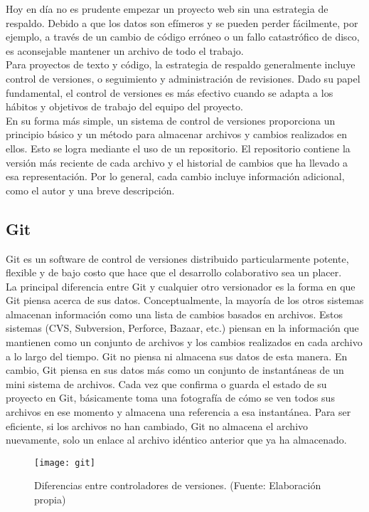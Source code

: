 Hoy en día no es prudente empezar un proyecto web sin una estrategia de respaldo. Debido a que los datos son efímeros y se pueden perder fácilmente, por ejemplo, a través de un cambio de código erróneo o un fallo catastrófico de disco, es aconsejable mantener un archivo de todo el trabajo.\\[0.8cm]
Para proyectos de texto y código, la estrategia de respaldo generalmente incluye control de versiones, o seguimiento y administración de revisiones.  Dado su papel fundamental, el control de versiones es más efectivo cuando se adapta a los hábitos y objetivos de trabajo del equipo del proyecto.\\[0.8cm]
En su forma más simple, un sistema de control de versiones proporciona un principio básico y un método para almacenar archivos y cambios realizados en ellos. Esto se logra mediante el uso de un repositorio. El repositorio contiene la versión más reciente de cada archivo y el historial de cambios que ha llevado a esa representación. Por lo general, cada cambio incluye información adicional, como el autor y una breve descripción.
\subsection{Git}
Git es un software de control de versiones distribuido particularmente potente, flexible y de bajo costo que hace que el desarrollo colaborativo sea un placer. \\[0.8cm]
La principal diferencia entre Git y cualquier otro versionador es la forma en que Git piensa acerca de sus datos. Conceptualmente, la mayoría de los otros sistemas almacenan información como una lista de cambios basados en archivos. Estos sistemas (CVS, Subversion, Perforce, Bazaar, etc.) piensan en la información que mantienen como un conjunto de archivos y los cambios realizados en cada archivo a lo largo del tiempo. Git no piensa ni almacena sus datos de esta manera. En cambio, Git piensa en sus datos más como un conjunto de instantáneas de un mini sistema de archivos. Cada vez que confirma o guarda el estado de su proyecto en Git, básicamente toma una fotografía de cómo se ven todos sus archivos en ese momento y almacena una referencia a esa instantánea. Para ser eficiente, si los archivos no han cambiado, Git no almacena el archivo nuevamente, solo un enlace al archivo idéntico anterior que ya ha almacenado. \\[0.8cm]
\begin{figure}[H]
  \centering
  \texttt{[image: git]}
  \caption{Diferencias entre controladores de versiones. (Fuente: Elaboración propia)}
\end{figure}